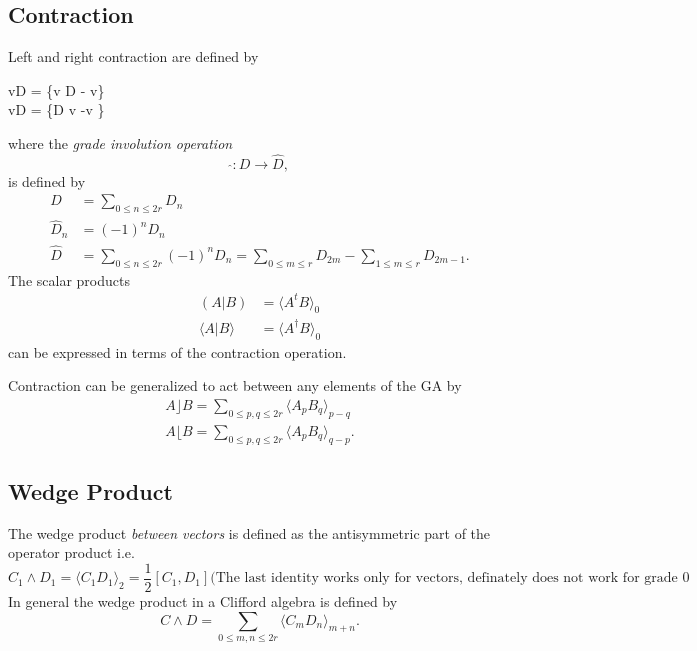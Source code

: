 \documentclass[aps, preprint]{revtex4}
\begin{document}
\subsection{Contraction}
Left and right contraction are defined by
\begin{align**}v\rfloor D = \left \{v D - v\right \} \\
v\lfloor D = \left \{D v -v \right \}\text{,}\end{align**}where the \emph{grade involution operation }
\begin{equation*}\widehat{} :D \rightarrow \hat{D}\text{,}
\end{equation*}is defined by
\begin{align*}D &  =\sum _{0 \leq n \leq 2 r}D_{n} \\
\hat{D}_{n} &  =\left ( -1\right )^{n} D_{n} \\
\widehat{D} &  =\sum _{0 \leq n \leq 2 r}\left ( -1\right )^{n} D_{n} =\sum _{0 \leq m \leq r}D_{2 m} -\sum _{1 \leq m \leq r}D_{2 m -1}\text{.}\end{align*}The scalar products
\begin{align}\left (A\left \vert B\right .\right ) &  = \langle A^{t} B \rangle _{0} \\
 \langle A\left \vert B\right . \rangle  &  = \langle A^{ \dag } B \rangle _{0}\end{align}can be expressed in terms of the contraction operation. 

Contraction can be generalized to act between
any elements of the GA by
\begin{align}A\rfloor B =\sum _{0 \leq p ,q \leq 2 r} \langle A_{p} B_{q} \rangle _{p -q} \\
A\lfloor B =\sum _{0 \leq p ,q \leq 2 r} \langle A_{p} B_{q} \rangle _{q -p}\text{.}\end{align}

\subsection{Wedge Product}
The wedge product \emph{between vectors} is defined as the antisymmetric part of the operator product i.e.
\begin{equation*}C_{1} \wedge D_{1} = \langle C_{1} D_{1} \rangle _{2} =\frac{1}{2} \left [C_{1} ,D_{1}\right ]\text{(The last identity works only for vectors, definately does not work for grade 0 elements).}
\end{equation*}In general the wedge product in a Clifford algebra is defined by
\begin{equation}C \wedge D =\sum _{0 \leq m ,n \leq 2 r} \langle C_{m} D_{n} \rangle _{m +n}\text{.}
\end{equation}
\end{document}
